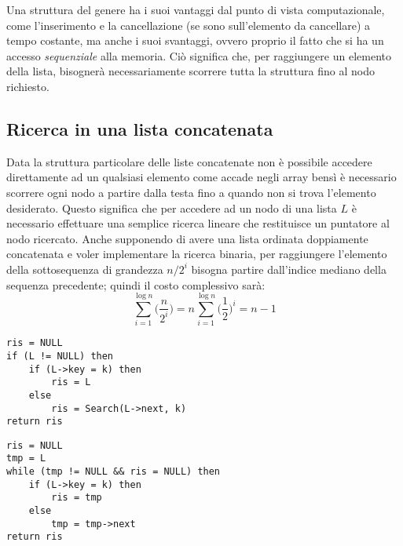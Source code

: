 Una struttura del genere ha i suoi vantaggi dal punto di vista computazionale, come l'inserimento e la cancellazione (se sono sull'elemento da cancellare) a tempo costante, ma anche i suoi svantaggi, ovvero proprio il fatto che si ha un accesso \textit{sequenziale} alla memoria. Ciò significa che, per raggiungere un elemento della lista, bisognerà necessariamente scorrere tutta la struttura fino al nodo richiesto.

\subsection{Ricerca in una lista concatenata}
Data la struttura particolare delle liste concatenate non è possibile accedere direttamente ad un qualsiasi elemento come accade negli array bensì è necessario scorrere ogni nodo a partire dalla testa fino a quando non si trova l'elemento desiderato. Questo significa che per accedere ad un nodo di una lista $L$ è necessario effettuare una semplice ricerca lineare che restituisce un puntatore al nodo ricercato. Anche supponendo di avere una lista ordinata doppiamente concatenata e voler implementare la ricerca binaria, per raggiungere l'elemento della sottosequenza di grandezza $n/2^{i}$ bisogna partire dall'indice mediano della sequenza precedente; quindi il costo complessivo sarà:
\begin{displaymath}
	\sum_{i=1}^{\log n} \bigl(\frac{n}{2^{i}}\bigl)=n\sum_{i=1}^{\log n} \bigl(\frac{1}{2}\bigl)^{i}=n-1
\end{displaymath}
\begin{center}
	\begin{minipage}{0.4\textwidth}
	\begin{lstlisting}[label = lst:SearchRec, language=asd, caption={SearchRec(L, k)}]
ris = NULL
if (L != NULL) then
    if (L->key = k) then
        ris = L
    else
        ris = Search(L->next, k)
return ris
\end{lstlisting}
\end{minipage}
\begin{minipage}{0.4\textwidth}
	\begin{lstlisting}[label = lst:SearchIter, language=asd, caption={SearchIter(L, k)}]
ris = NULL
tmp = L
while (tmp != NULL && ris = NULL) then
    if (L->key = k) then
        ris = tmp
    else
        tmp = tmp->next
return ris
\end{lstlisting}
\end{minipage}
\end{center}

